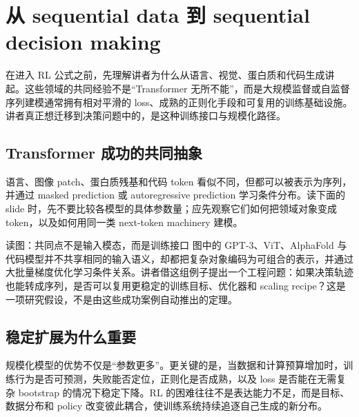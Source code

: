 \section{从 sequential data 到 sequential decision making}

在进入 RL 公式之前，先理解讲者为什么从语言、视觉、蛋白质和代码生成讲起。这些领域的共同经验不是“Transformer 无所不能”，而是大规模监督或自监督序列建模通常拥有相对平滑的 loss、成熟的正则化手段和可复用的训练基础设施。讲者真正想迁移到决策问题中的，是这种训练接口与规模化路径。

\subsection{Transformer 成功的共同抽象}

语言、图像 patch、蛋白质残基和代码 token 看似不同，但都可以被表示为序列，并通过 masked prediction 或 autoregressive prediction 学习条件分布。读下面的 slide 时，先不要比较各模型的具体参数量；应先观察它们如何把领域对象变成 token，以及如何用同一类 next-token machinery 建模。


\begin{knowledgebox}{读图：共同点不是输入模态，而是训练接口}
图中的 GPT-3、ViT、AlphaFold 与代码模型并不共享相同的输入语义，却都把复杂对象编码为可组合的表示，并通过大批量梯度优化学习条件关系。讲者借这组例子提出一个工程问题：如果决策轨迹也能转成序列，是否可以复用更稳定的训练目标、优化器和 scaling recipe？这是一项研究假设，不是由这些成功案例自动推出的定理。
\end{knowledgebox}

\subsection{稳定扩展为什么重要}

规模化模型的优势不仅是“参数更多”。更关键的是，当数据和计算预算增加时，训练行为是否可预测，失败能否定位，正则化是否成熟，以及 loss 是否能在无需复杂 bootstrap 的情况下稳定下降。RL 的困难往往不是表达能力不足，而是目标、数据分布和 policy 改变彼此耦合，使训练系统持续追逐自己生成的新分布。


